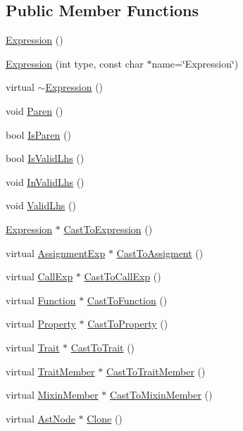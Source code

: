 \subsection*{Public Member Functions}
\begin{DoxyCompactItemize}
\item 
\hyperlink{classmocha_1_1_expression_a065032b38f3408d211df4bb6592af555}{Expression} ()
\item 
\hyperlink{classmocha_1_1_expression_ae79614f416f4fd9ef8c0e213ac53de6d}{Expression} (int type, const char $\ast$name=\char`\"{}Expression\char`\"{})
\item 
virtual \hyperlink{classmocha_1_1_expression_a55e9664e2b30613a55cb27e329c5560f}{$\sim$Expression} ()
\item 
void \hyperlink{classmocha_1_1_expression_a6d0d3990261dbd7a52aae5d2d83456f7}{Paren} ()
\item 
bool \hyperlink{classmocha_1_1_expression_a08f5d87b2974da4f58be4a95f5ab599d}{IsParen} ()
\item 
bool \hyperlink{classmocha_1_1_expression_a939ff839a3024d6d570913d5eae0b4ea}{IsValidLhs} ()
\item 
void \hyperlink{classmocha_1_1_expression_a89d9eb28d4537c77218853d5a888ff78}{InValidLhs} ()
\item 
void \hyperlink{classmocha_1_1_expression_aa690dc40a63b26d2ec5715b96aa18435}{ValidLhs} ()
\item 
\hyperlink{classmocha_1_1_expression}{Expression} $\ast$ \hyperlink{classmocha_1_1_expression_a518359725d2a90e69242d85594bc0b30}{CastToExpression} ()
\item 
virtual \hyperlink{classmocha_1_1_assignment_exp}{AssignmentExp} $\ast$ \hyperlink{classmocha_1_1_expression_ac9487a84166be5500145ae33523ebfdf}{CastToAssigment} ()
\item 
virtual \hyperlink{classmocha_1_1_call_exp}{CallExp} $\ast$ \hyperlink{classmocha_1_1_expression_a9bb8722ec476068afb58505699c7b2ff}{CastToCallExp} ()
\item 
virtual \hyperlink{classmocha_1_1_function}{Function} $\ast$ \hyperlink{classmocha_1_1_expression_a56027507124496007854f768cd847d52}{CastToFunction} ()
\item 
virtual \hyperlink{classmocha_1_1_property}{Property} $\ast$ \hyperlink{classmocha_1_1_expression_a29abca4b62263cbb9b71374bacac61c4}{CastToProperty} ()
\item 
virtual \hyperlink{classmocha_1_1_trait}{Trait} $\ast$ \hyperlink{classmocha_1_1_expression_a0c4a99f19c5144628707b20aaba7b53f}{CastToTrait} ()
\item 
virtual \hyperlink{classmocha_1_1_trait_member}{TraitMember} $\ast$ \hyperlink{classmocha_1_1_expression_a0bb72b025f6ef154427a29de109a5af5}{CastToTraitMember} ()
\item 
virtual \hyperlink{classmocha_1_1_mixin_member}{MixinMember} $\ast$ \hyperlink{classmocha_1_1_expression_a5c0da23f4477b3034e44cc08950bf16d}{CastToMixinMember} ()
\item 
virtual \hyperlink{classmocha_1_1_ast_node}{AstNode} $\ast$ \hyperlink{classmocha_1_1_expression_ac1fb936e2bf0fdd6e7667275d3723ca5}{Clone} ()
\end{DoxyCompactItemize}
